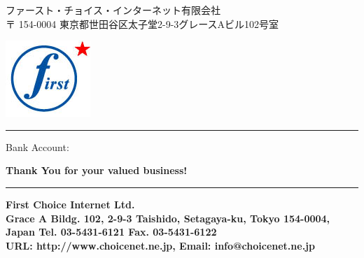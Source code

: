 \documentclass[10pt,a4paper,oneside,onecolumn]{scrartcl}
\begin{document}
\begin{CJK}{UTF8}{arialuni}

\vspace*{-3.3cm}

\parbox[b]{\textwidth}{%

	\parbox[c]{0.7\textwidth}
	{\Large ファースト・チョイス・インターネット有限会社 \\
	 \normalsize 〒 154-0004 東京都世田谷区太子堂2-9-3グレースAビル102号室 \\
	 }
 	\hfill
 	\parbox[c]{0.15\textwidth}{
 	\includegraphics[scale=0.1]{./fclogo}
 	}
 	\rule[1.5em]{\textwidth}{0.5pt}
}

\vfill

Bank Account:

\vspace{1cm}

\centerline{\textbf{Thank You for your valued business!}}

\rule{\textwidth}{0.5pt}

\parbox[b][45pt][b]{\textwidth}{%
\Large\bf First Choice Internet Ltd. \\ 
\small
Grace A Bildg. 102, 2-9-3 Taishido, Setagaya-ku, Tokyo 154-0004, Japan Tel. 03-5431-6121 Fax. 03-5431-6122 \\
URL: http://www.choicenet.ne.jp, Email: info@choicenet.ne.jp
}



\end{CJK}
\end{document}
